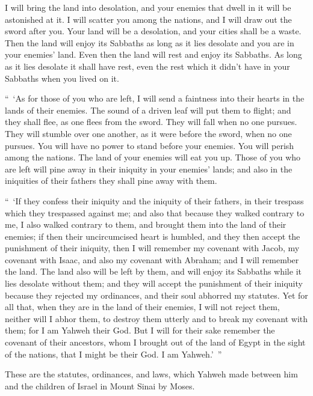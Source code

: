 {I will bring the land into desolation, and your enemies that dwell in it will be astonished at it.
I will scatter you among the nations, and I will draw out the sword after you. Your land will be a desolation, and your cities shall be a waste.
Then the land will enjoy its Sabbaths as long as it lies desolate and you are in your enemies’ land. Even then the land will rest and enjoy its Sabbaths.
As long as it lies desolate it shall have rest, even the rest which it didn’t have in your Sabbaths when you lived on it.
\par }{\PP {}“ ‘As for those of you who are left, I will send a faintness into their hearts in the lands of their enemies. The sound of a driven leaf will put them to flight; and they shall flee, as one flees from the sword. They will fall when no one pursues.
They will stumble over one another, as it were before the sword, when no one pursues. You will have no power to stand before your enemies.
You will perish among the nations. The land of your enemies will eat you up.
Those of you who are left will pine away in their iniquity in your enemies’ lands; and also in the iniquities of their fathers they shall pine away with them.
\par }{\PP {}“ ‘If they confess their iniquity and the iniquity of their fathers, in their trespass which they trespassed against me; and also that because they walked contrary to me,
I also walked contrary to them, and brought them into the land of their enemies; if then their uncircumcised heart is humbled, and they then accept the punishment of their iniquity,
then I will remember my covenant with Jacob, my covenant with Isaac, and also my covenant with Abraham; and I will remember the land.
The land also will be left by them, and will enjoy its Sabbaths while it lies desolate without them; and they will accept the punishment of their iniquity because they rejected my ordinances, and their soul abhorred my statutes.
Yet for all that, when they are in the land of their enemies, I will not reject them, neither will I abhor them, to destroy them utterly and to break my covenant with them; for I am Yahweh their God.
But I will for their sake remember the covenant of their ancestors, whom I brought out of the land of Egypt in the sight of the nations, that I might be their God. I am Yahweh.’ ”
\par }{\PP {}These are the statutes, ordinances, and laws, which Yahweh made between him and the children of Israel in Mount Sinai by Moses.

}
